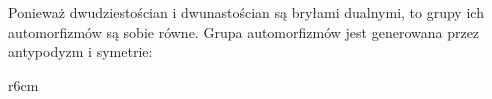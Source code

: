 
Ponieważ dwudziestościan i dwunastościan są bryłami dualnymi, to grupy ich automorfizmów są sobie równe. Grupa automorfizmów jest generowana przez antypodyzm i symetrie:

\begin{wrapfigure}{r}{6cm}
\begin{center}
\end{center}
\end{wrapfigure}
